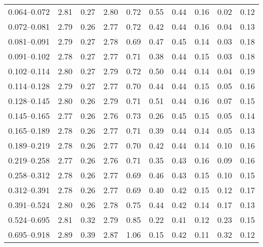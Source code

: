 \begin{table}
\begin{center}
\begin{tabular}{@{}l l l l l l l l l l@{}}
            0.064--0.072     &  2.81   &  0.27   &  2.80         &  0.72      &  0.55    &  0.44  &  0.16       &  0.02  &  0.12  \\
            0.072--0.081     &  2.79   &  0.26   &  2.77         &  0.72      &  0.42    &  0.44  &  0.16       &  0.04  &  0.13  \\
            0.081--0.091     &  2.79   &  0.27   &  2.78         &  0.69      &  0.47    &  0.45  &  0.14       &  0.03  &  0.18  \\
            0.091--0.102     &  2.78   &  0.27   &  2.77         &  0.71      &  0.38    &  0.44  &  0.15       &  0.03  &  0.18  \\
            0.102--0.114     &  2.80   &  0.27   &  2.79         &  0.72      &  0.50    &  0.44  &  0.14       &  0.04  &  0.19  \\
            0.114--0.128     &  2.79   &  0.27   &  2.77         &  0.70      &  0.44    &  0.44  &  0.15       &  0.05  &  0.16  \\
            0.128--0.145     &  2.80   &  0.26   &  2.79         &  0.71      &  0.51    &  0.44  &  0.16       &  0.07  &  0.15  \\
            0.145--0.165     &  2.77   &  0.26   &  2.76         &  0.73      &  0.26    &  0.45  &  0.15       &  0.05  &  0.14  \\
            0.165--0.189     &  2.78   &  0.26   &  2.77         &  0.71      &  0.39    &  0.44  &  0.14       &  0.05  &  0.13  \\
            0.189--0.219     &  2.78   &  0.26   &  2.77         &  0.70      &  0.42    &  0.44  &  0.14       &  0.10  &  0.16  \\
            0.219--0.258     &  2.77   &  0.26   &  2.76         &  0.71      &  0.35    &  0.43  &  0.16       &  0.09  &  0.16  \\
            0.258--0.312     &  2.78   &  0.26   &  2.77         &  0.69      &  0.46    &  0.43  &  0.15       &  0.10  &  0.15  \\
            0.312--0.391     &  2.78   &  0.26   &  2.77         &  0.69      &  0.40    &  0.42  &  0.15       &  0.12  &  0.17  \\
            0.391--0.524     &  2.80   &  0.26   &  2.78         &  0.75      &  0.44    &  0.42  &  0.14       &  0.17  &  0.13  \\
            0.524--0.695     &  2.81   &  0.32   &  2.79         &  0.85      &  0.22    &  0.41  &  0.12       &  0.23  &  0.15  \\
            0.695--0.918     &  2.89   &  0.39   &  2.87         &  1.06      &  0.15    &  0.42  &  0.11       &  0.32  &  0.12  \\

\end{tabular}
\end{center}
\end{table}
